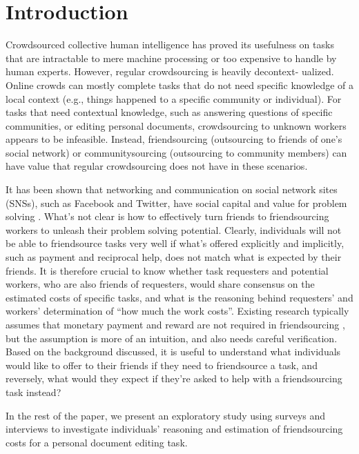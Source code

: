 \section{Introduction}

Crowdsourced collective human intelligence has proved its usefulness on tasks 
that are intractable to mere machine processing or too expensive to handle by human experts. 
However, regular crowdsourcing is heavily decontext- ualized. 
Online crowds can mostly complete tasks that do not need specific knowledge of a local context 
(e.g., things happened to a specific community or individual). 
For tasks that need contextual knowledge, 
such as answering questions of specific communities, or editing personal documents, 
crowdsourcing to unknown workers appears to be infeasible. 
Instead, friendsourcing (outsourcing to friends of one's social network) \cite{Bernstein:TOCHI10:Collabio}
or communitysourcing (outsourcing to community members) \cite{Heimerl:CHI12:CommunitySourcing} 
can have value that regular crowdsourcing does not have in these scenarios.

It has been shown that networking and communication on social network sites (SNSs), such as Facebook and Twitter, 
have social capital and value for problem solving \cite{Gray:CSCW13:WhoWantsKnow}. 
What's not clear is how to effectively turn friends to friendsourcing workers to unleash their problem solving potential. 
Clearly, individuals will not be able to friendsource tasks very well if what's offered explicitly and implicitly, 
such as payment and reciprocal help, does not match what is expected by their friends. 
It is therefore crucial to know whether task requesters and potential workers, who are also friends of requesters, 
would share consensus on the estimated costs of specific tasks, 
and what is the reasoning behind requesters' and workers' determination of ``how much the work costs''. 
Existing research typically assumes that monetary payment and reward are not required in friendsourcing \cite{Rzeszotarski:CHI14:SocialCost}, 
but the assumption is more of an intuition, and also needs careful verification. 
Based on the background discussed, 
it is useful to understand what individuals would like to offer to their friends if they need to friendsource a task, 
and reversely, what would they expect if they're asked to help with a friendsourcing task instead?

In the rest of the paper, 
we present an exploratory study using surveys and interviews to investigate individuals' reasoning and 
estimation of friendsourcing costs for a personal document editing task.




